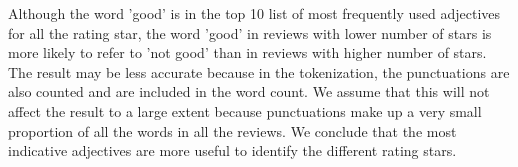 Although the word 'good' is in the top 10 list of most frequently used adjectives for all the rating star, the word 'good' in reviews with lower number of stars is more likely to refer to 'not good' than in reviews with higher number of stars. The result may be less accurate because in the tokenization, the punctuations are also counted and are included in the word count. We assume that this will not affect the result to a large extent because punctuations make up a very small proportion of all the words in all the reviews. We conclude that the most indicative adjectives are more useful to identify the different rating stars.